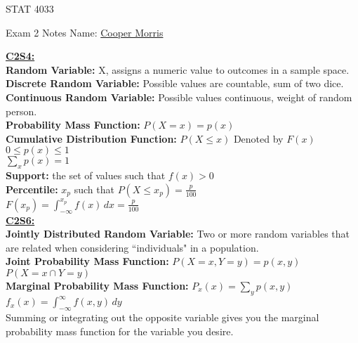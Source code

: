 \documentclass[letter, 12pt]{article}
\begin{document}
\begin{center}
STAT 4033
\end{center}
Exam 2 Notes \hfill Name: \uline{Cooper Morris}
\begin{multicols}{2}
\textbf{\uline{C2S4:}}\\
\textbf{Random Variable:} X, assigns a numeric value to outcomes in a sample space.\\
\textbf{Discrete Random Variable:} Possible values are countable, sum of two dice.\\
\textbf{Continuous Random Variable:} Possible values continuous, weight of random person.\\
\textbf{Probability Mass Function:} \(P(X=x) = p(x)\) \\
\textbf{Cumulative Distribution Function:} \(P(X\leq x) \) Denoted by \(F(x)\) \\
\(0\leq p(x) \leq 1\)\\
\(\sum_xp(x) = 1\)\\
\textbf{Support:} the set of values such that \(f(x) > 0	\)\\
\textbf{Percentile:} \(x_p\) such that \(P(X\leq x_p) = \frac{p}{100}\)\\
\(F(x_p) = \int_{-\infty}^{x_p} f(x)\,dx = \frac{p}{100}\)\\
\textbf{\uline{C2S6:}}\\
\textbf{Jointly Distributed Random Variable:} Two or more random variables that are related when considering ``individuals" in a population.\\
\textbf{Joint Probability Mass Function:} \(P(X=x, Y=y) = p(x,y)\) \(P(X=x \cap Y=y)\) \\
\textbf{Marginal Probability Mass Function:} \(P_x(x) = \sum_y p(x,y)\)\\
\(f_x(x) = \int_{-\infty}^\infty f(x,y)\,dy\)\\
Summing or integrating out the opposite variable gives you the marginal probability mass function for the variable you desire.

\vfill
\columnbreak
\vspace*{\fill}
\end{multicols}
\newpage
\end{document}
